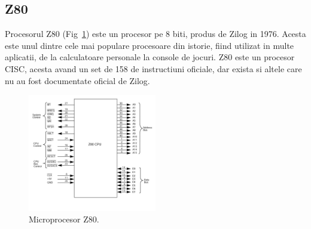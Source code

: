\documentclass[titlepage,12pt]{article}
\begin{document}
\subsection{\ac {Z80}}
Procesorul Z80 (Fig~\ref{fig:z80}) este un procesor pe 8 biti, produs de Zilog in 1976. Acesta este unul dintre cele mai populare procesoare din istorie, fiind utilizat in multe aplicatii, de la calculatoare personale la console de jocuri.
\ac {Z80} este un procesor CISC, acesta avand un set de 158 de instructiuni oficiale, dar exista si altele care nu au fost documentate oficial de Zilog.

\begin{figure}[H]
    \centering
    \includegraphics[width=0.5\textwidth]{images/z80.jpg}
    \caption{Microprocesor Z80.}
    \label{fig:z80}
\end{figure}
\end{document}

